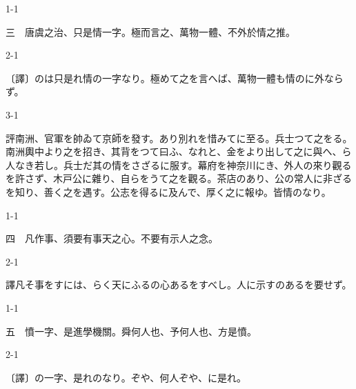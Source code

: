 \documentclass[tate,paper=b6j,jafontsize=9pt]{jlreq}
\begin{document}
\begin{azconvIndented}{1\zw}{-1\zw}

三　唐虞之治、只是情一字。極而言之、萬物一體、不外於情之推。

\end{azconvIndented}
\begin{azconvIndented}{2\zw}{-1\zw}

〔譯〕のは只是れ情の一字なり。極めて之を言へば、萬物一體も情のに外ならず。

\end{azconvIndented}
\begin{azconvIndented}{3\zw}{-1\zw}

評南洲、官軍を帥ゐて京師を發す。あり別れを惜みてに至る。兵士つて之をる。南洲輿中より之を招き、其背をつて曰ふ、なれと、金をより出して之に與へ、ら人なき若し。兵士だ其の情をさざるに服す。幕府を神奈川にき、外人の來り觀るを許さず、木戸公に雜り、自らをうて之を觀る。茶店のあり、公の常人に非ざるを知り、善く之を遇す。公志を得るに及んで、厚く之に報ゆ。皆情のなり。

\end{azconvIndented}

\begin{azconvIndented}{1\zw}{-1\zw}

四　凡作事、須要有事天之心。不要有示人之念。

\end{azconvIndented}
\begin{azconvIndented}{2\zw}{-1\zw}

譯凡そ事をすには、らく天にふるの心あるをすべし。人に示すのあるを要せず。

\end{azconvIndented}

\begin{azconvIndented}{1\zw}{-1\zw}

五　憤一字、是進學機關。舜何人也、予何人也、方是憤。

\end{azconvIndented}
\begin{azconvIndented}{2\zw}{-1\zw}

〔譯〕の一字、是れのなり。ぞや、何人ぞや、に是れ。

\end{azconvIndented}
\end{document}
